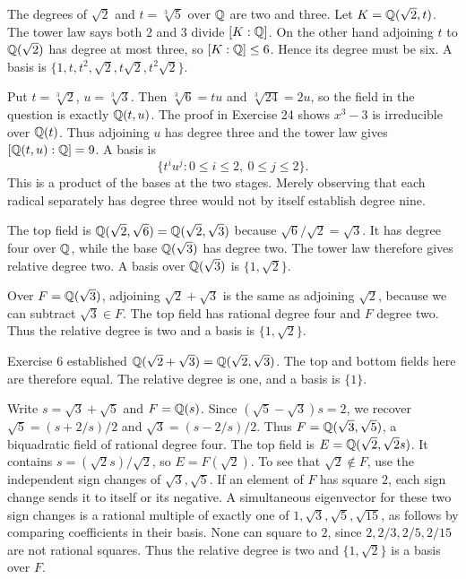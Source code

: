 The degrees of $\sqrt2$ and $t=\sqrt[3]5$ over $\mathbb{Q}$ are two and three. Let $K=\mathbb{Q}(\sqrt2,t)$. The tower law says both $2$ and $3$ divide $[K:\mathbb{Q}]$. On the other hand adjoining $t$ to $\mathbb{Q}(\sqrt2)$ has degree at most three, so $[K:\mathbb{Q}]\le6$. Hence its degree must be six. A basis is $\{1,t,t^2,\sqrt2,t\sqrt2,t^2\sqrt2\}$.

Put $t=\sqrt[3]2$, $u=\sqrt[3]3$. Then $\sqrt[3]6=tu$ and $\sqrt[3]{24}=2u$, so the field in the question is exactly $\mathbb{Q}(t,u)$.
The proof in Exercise 24 shows $x^3-3$ is irreducible over $\mathbb{Q}(t)$. Thus adjoining $u$ has degree three and the tower law gives $[\mathbb{Q}(t,u):\mathbb{Q}]=9$. A basis is
\[\{t^iu^j:0\le i\le2,\ 0\le j\le2\}.\]
This is a product of the bases at the two stages. Merely observing that each radical separately has degree three would not by itself establish degree nine.

The top field is $\mathbb{Q}(\sqrt2,\sqrt6)=\mathbb{Q}(\sqrt2,\sqrt3)$ because $\sqrt6/\sqrt2=\sqrt3$. It has degree four over $\mathbb{Q}$, while the base $\mathbb{Q}(\sqrt3)$ has degree two. The tower law therefore gives relative degree two. A basis over $\mathbb{Q}(\sqrt3)$ is $\{1,\sqrt2\}$.

Over $F=\mathbb{Q}(\sqrt3)$, adjoining $\sqrt2+\sqrt3$ is the same as adjoining $\sqrt2$, because we can subtract $\sqrt3\in F$. The top field has rational degree four and $F$ degree two. Thus the relative degree is two and a basis is $\{1,\sqrt2\}$.

Exercise 6 established $\mathbb{Q}(\sqrt2+\sqrt3)=\mathbb{Q}(\sqrt2,\sqrt3)$. The top and bottom fields here are therefore equal. The relative degree is one, and a basis is $\{1\}$.

Write $s=\sqrt3+\sqrt5$ and $F=\mathbb{Q}(s)$. Since $(\sqrt5-\sqrt3)s=2$, we recover $\sqrt5=(s+2/s)/2$ and $\sqrt3=(s-2/s)/2$. Thus $F=\mathbb{Q}(\sqrt3,\sqrt5)$, a biquadratic field of rational degree four.
The top field is $E=\mathbb{Q}(\sqrt2,\sqrt2s)$. It contains $s=(\sqrt2s)/\sqrt2$, so $E=F(\sqrt2)$.
To see that $\sqrt2\notin F$, use the independent sign changes of $\sqrt3,\sqrt5$. If an element of $F$ has square $2$, each sign change sends it to itself or its negative. A simultaneous eigenvector for these two sign changes is a rational multiple of exactly one of $1,\sqrt3,\sqrt5,\sqrt{15}$, as follows by comparing coefficients in their basis. None can square to $2$, since $2,2/3,2/5,2/15$ are not rational squares. Thus the relative degree is two and $\{1,\sqrt2\}$ is a basis over $F$.

